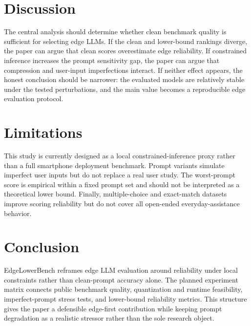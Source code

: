 \documentclass[letterpaper]{article}
\newcommand{\method}{EdgeLowerBench}
\begin{document}
\section{Discussion}

The central analysis should determine whether clean benchmark quality is sufficient for selecting edge LLMs. If the clean and lower-bound rankings diverge, the paper can argue that clean scores overestimate edge reliability. If constrained inference increases the prompt sensitivity gap, the paper can argue that compression and user-input imperfections interact. If neither effect appears, the honest conclusion should be narrower: the evaluated models are relatively stable under the tested perturbations, and the main value becomes a reproducible edge evaluation protocol.

\section{Limitations}

This study is currently designed as a local constrained-inference proxy rather than a full smartphone deployment benchmark. Prompt variants simulate imperfect user inputs but do not replace a real user study. The worst-prompt score is empirical within a fixed prompt set and should not be interpreted as a theoretical lower bound. Finally, multiple-choice and exact-match datasets improve scoring reliability but do not cover all open-ended everyday-assistance behavior.

\section{Conclusion}

\method{} reframes edge LLM evaluation around reliability under local constraints rather than clean-prompt accuracy alone. The planned experiment matrix connects public benchmark quality, quantization and runtime feasibility, imperfect-prompt stress tests, and lower-bound reliability metrics. This structure gives the paper a defensible edge-first contribution while keeping prompt degradation as a realistic stressor rather than the sole research object.


\end{document}
